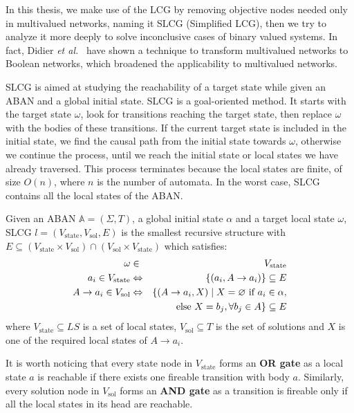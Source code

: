In this thesis, we make use of the LCG by removing objective nodes needed only in multivalued networks, naming it SLCG (Simplified LCG), then we try to analyze it more deeply to solve inconclusive cases of binary valued systems.
In fact, Didier \textit{et al.}~\cite{didier2011mapping} have shown a technique to transform multivalued networks to Boolean networks, which broadened the applicability to multivalued networks.

SLCG is aimed at studying the reachability of a target state while given an ABAN and a global initial state.
SLCG is a goal-oriented method.
It starts with the target state $\omega$, look for transitions reaching the target state, then replace $\omega$ with the bodies of these transitions.
If the current target state is included in the initial state, we find the causal path from the initial state towards $\omega$, otherwise we continue the process, until we reach the initial state or local states we have already traversed.
This process terminates because the local states are finite, of size $O(n)$, where $n$ is the number of automata.
In the worst case, SLCG contains all the local states of the ABAN.

\begin{definition}\label{defSLCG}
Given an ABAN $\mathbb{A} = (\Sigma,T)$, a global initial state $\alpha$ and a target local state $\omega$, SLCG $l= (V_{\mathrm{state}},V_{\mathrm{sol}},E)$ is the smallest recursive structure with $E \subseteq (V_{\mathrm{state}}\times V_{\mathrm{sol}})\cap (V_{\mathrm{sol}}\times V_{\mathrm{state}})$ which satisfies:
\begin{eqnarray*}
    \omega&\in& V_{\mathrm{state}} \\
    a_i\in V_{\mathrm{state}} &\Leftrightarrow& \{ (a_i, A\to a_i)\}\subseteq E \\
    A\to a_i\in V_{\mathrm{sol}}&\Leftrightarrow& \{ (A\to a_i,X)\mid X= \varnothing \text{ \rm if } a_i\in \alpha,\\
    &&\text{else }  X= b_j, \forall b_j\in A\}\subseteq E
\end{eqnarray*}
where $V_{\mathrm{state}}\subseteq LS$ is a set of local states, $V_{\mathrm{sol}}\subseteq T$ is the set of solutions and $X$ is one of the required local states of $A\to a_i$.
\end{definition}

It is worth noticing that every state node in $V_{\mathrm{state}}$ forms an \textbf{OR gate} as a local state $a$ is reachable if there exists one fireable transition with body $a$.
Similarly, every solution node in $V_{\mathrm{sol}}$ forms an \textbf{AND gate} as a transition is fireable only if all the local states in its head are reachable.

